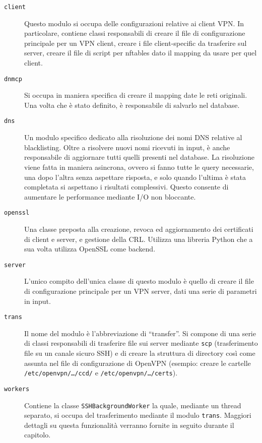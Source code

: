 \begin{description}
  \item[\texttt{client}]Questo modulo si occupa delle configurazioni relative ai
  client VPN. In particolare, contiene classi responsabili di creare il file
  di configurazione principale per un VPN client, creare i file client-specific
  da trasferire sul server, creare il file di script per nftables dato il mapping
  da usare per quel client.
  \item[\texttt{dnmcp}]Si occupa in maniera specifica di creare il mapping date
  le reti originali. Una volta che è stato definito, è responsabile di salvarlo
  nel database.
  \item[\texttt{dns}]Un modulo specifico dedicato alla risoluzione dei nomi
  DNS relative al blacklisting. Oltre a risolvere nuovi nomi ricevuti in input,
  è anche responsabile di aggiornare tutti quelli presenti nel database.
  La risoluzione viene fatta in maniera asincrona, ovvero si fanno tutte le query
  necessarie, una dopo l'altra senza aspettare risposta, e solo quando l'ultima
  è stata completata si aspettano i risultati complessivi. Questo consente
  di aumentare le performance mediante I/O non bloccante.
  \item[\texttt{openssl}]Una classe preposta alla creazione, revoca ed aggiornamento
  dei certificati di client e server, e gestione della CRL. Utilizza una
  libreria Python che a sua volta utilizza OpenSSL come backend.
  \item[\texttt{server}]L'unico compito dell'unica classe di questo modulo è quello
  di creare il file di configurazione principale per un VPN server, dati una serie
  di parametri in input.
  \item[\texttt{trans}]Il nome del modulo è l'abbreviazione di ``transfer''. Si
  compone di una serie di classi responsabili di trasferire file sui server mediante
  \texttt{scp} (trasferimento file su un canale sicuro SSH) e di creare
  la struttura di directory così come assunta nel file di configurazione di OpenVPN
  (esempio: creare le cartelle \texttt{/etc/openvpn/\ldots/ccd/} e \texttt{/etc/openvpn/\ldots/certs}).
  \item[\texttt{workers}]Contiene la classe \texttt{SSHBackgroundWorker} la quale, mediante
  un thread separato, si occupa del trasferimento mediante il modulo \texttt{trans}.
  Maggiori dettagli su questa funzionalità verranno fornite in seguito durante
  il capitolo.
\end{description}

